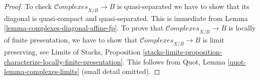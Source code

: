 \documentclass{stacks-project}
\theoremstyle{plain}
\theoremstyle{definition}
\theoremstyle{remark}
\numberwithin{equation}{subsection}
\def\Complexesstack{\mathcal{C}\!\mathit{omplexes}}
\begin{document}
\begin{proof}
To check $\Complexesstack_{X/B} \to B$ is quasi-separated we have to
show that its diagonal is quasi-compact and quasi-separated.
This is immediate from Lemma \ref{lemma-complexes-diagonal-affine-fp}.
To prove that $\Complexesstack_{X/B} \to B$ is locally of finite
presentation, we have to show that $\Complexesstack_{X/B} \to B$
is limit preserving, see
Limits of Stacks, Proposition
\ref{stacks-limits-proposition-characterize-locally-finite-presentation}.
This follows from Quot, Lemma \ref{quot-lemma-complexes-limits}
(small detail omitted).
\end{proof}









\end{document}
